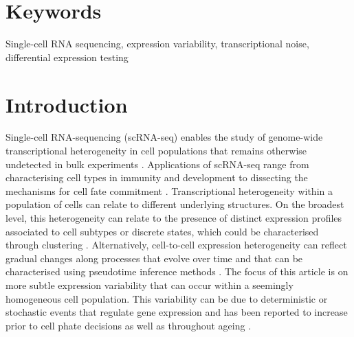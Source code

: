 \documentclass[9pt,a4paper,]{extarticle}
\begin{document}
\section*{Keywords}
Single-cell RNA sequencing, expression variability, transcriptional noise, differential expression testing


\clearpage
\pagestyle{main}

\hypertarget{introduction}{%
\section{Introduction}\label{introduction}}

Single-cell RNA-sequencing (scRNA-seq) enables the study of genome-wide
transcriptional heterogeneity in cell populations that remains otherwise
undetected in bulk experiments \citep{Stegle2015, Prakadan2017, Patange2018}.
Applications of scRNA-seq range from characterising cell types in immunity
\citep{Lonnberg2017, Villani2017, Zheng2017} and development \citep{Ibarra-Soria2018, Wagner2018, Pijuan-Sala2019} to dissecting the mechanisms for cell fate
commitment \citep{Goolam2016, Ohnishi2014}.
Transcriptional heterogeneity within a population of cells can relate to
different underlying structures.
On the broadest level, this heterogeneity can relate to the presence of distinct
expression profiles associated to cell subtypes or discrete states, which
could be characterised through clustering \citep{Kiselev2019}.
Alternatively, cell-to-cell expression heterogeneity can reflect gradual
changes along processes that evolve over time and that can be characterised
using pseudotime inference methods \citep{Saelens2019}.
The focus of this article is on more subtle expression variability that can
occur within a seemingly homogeneous cell population. This variability can be
due to deterministic or stochastic events that regulate gene expression and has
been reported to increase prior to cell phate decisions \citep{Mojtahedi2016} as well
as throughout ageing \citep{Martinez-jimenez2017}.
\end{document}
